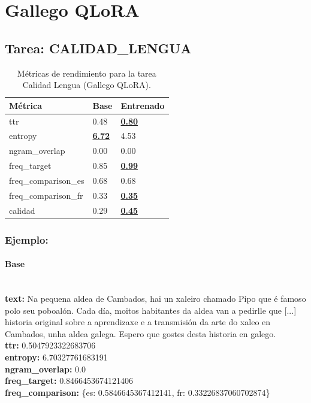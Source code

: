 \section{Gallego QLoRA}

\subsection{Tarea: CALIDAD\_LENGUA}\label{tarea-calidad_lengua}
\begin{longtable}[]{@{}lll@{}}
\toprule\noalign{}
Métrica & Base & Entrenado \\
\midrule\noalign{}
\endhead
\bottomrule\noalign{}
\caption{Métricas de rendimiento para la tarea Calidad Lengua (Gallego QLoRA).}
\label{tab:metricas_calidad_lengua_Gallego QLoRA}
\endlastfoot
ttr & 0.48 & \textbf{\underline{0.80}} \\
entropy & \textbf{\underline{6.72}} & 4.53 \\
ngram\_overlap & 0.00 & 0.00 \\
freq\_target & 0.85 & \textbf{\underline{0.99}} \\
freq\_comparison\_es & 0.68 & 0.68 \\
freq\_comparison\_fr & 0.33 & \textbf{\underline{0.35}} \\
calidad & 0.29 & \textbf{\underline{0.45}} \\
\end{longtable}

\subsubsection{Ejemplo:}

\paragraph{Base}~\\
\textbf{text:} Na pequena aldea de Cambados, hai un xaleiro chamado Pipo que é famoso polo seu poboalón. Cada día, moitos habitantes da aldea van a pedirlle que  [...] historia original sobre a aprendizaxe e a transmisión da arte do xaleo en Cambados, unha aldea galega. Espero que gostes desta historia en galego.\\
\textbf{ttr:} 0.5047923322683706\\
\textbf{entropy:} 6.70327761683191\\
\textbf{ngram\_overlap:} 0.0\\
\textbf{freq\_target:} 0.8466453674121406\\
\textbf{freq\_comparison:} \{\textquotesingle{}es\textquotesingle{}: 0.5846645367412141, \textquotesingle{}fr\textquotesingle{}: 0.33226837060702874\}

